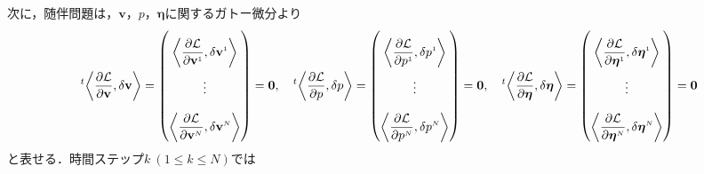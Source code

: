 次に，随伴問題は，$\mathbf{v}$，$p$，$\boldsymbol{\eta}$に関するガトー微分より
\begin{equation}
    \everymath{\displaystyle}
    \setlength{\arraycolsep}{0.5pt}
    \renewcommand{\arraystretch}{2.5}
    \label{eq:adjoint_problem}
    {}^{t}\!\left\langle\frac{\partial \mathcal{L}}{\partial \mathbf{v}}, \delta \mathbf{v}\right\rangle
    = \begin{pmatrix}
        \left\langle\frac{\partial \mathcal{L}}{\partial \mathbf{v}^{\scriptscriptstyle 1}}, \delta \mathbf{v}^{\scriptscriptstyle 1}\right\rangle \\
        \vdots \\
        \left\langle\frac{\partial \mathcal{L}}{\partial \mathbf{v}^{\scriptscriptstyle N}}, \delta \mathbf{v}^{\scriptscriptstyle N}\right\rangle 
    \end{pmatrix}
    =\mathbf{0}
    ,\quad
    {}^{t}\!\left\langle\frac{\partial \mathcal{L}}{\partial p}, \delta p\right\rangle
    = \begin{pmatrix}
        \left\langle\frac{\partial \mathcal{L}}{\partial p^{\scriptscriptstyle 1}}, \delta p^{\scriptscriptstyle 1}\right\rangle \\
        \vdots \\
        \left\langle\frac{\partial \mathcal{L}}{\partial p^{\scriptscriptstyle N}}, \delta p^{\scriptscriptstyle N}\right\rangle 
    \end{pmatrix}
    =\mathbf{0}
    ,\quad
    {}^{t}\!\left\langle\frac{\partial \mathcal{L}}{\partial \boldsymbol{\eta}}, \delta \boldsymbol{\eta}\right\rangle
    = \begin{pmatrix}
        \left\langle\frac{\partial \mathcal{L}}{\partial \boldsymbol{\eta}^{\scriptscriptstyle 1}}, \delta \boldsymbol{\eta}^{\scriptscriptstyle 1}\right\rangle \\
        \vdots \\
        \left\langle\frac{\partial \mathcal{L}}{\partial \boldsymbol{\eta}^{\scriptscriptstyle N}}, \delta \boldsymbol{\eta}^{\scriptscriptstyle N}\right\rangle 
    \end{pmatrix}
    =\mathbf{0}
\end{equation}
と表せる．時間ステップ$k \ (1 \leq k \leq N)$では
